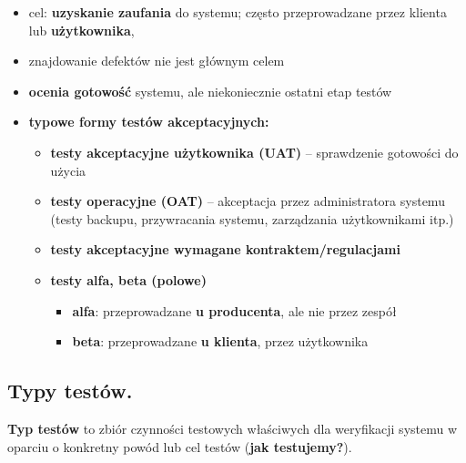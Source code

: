 \documentclass[main.tex]{subfiles}
\begin{document}
    \begin{itemize}[noitemsep]
        \item cel: \textbf{uzyskanie zaufania} do systemu; często przeprowadzane przez klienta lub \textbf{użytkownika},
        \item znajdowanie defektów nie jest głównym celem
        \item \textbf{ocenia gotowość} systemu, ale niekoniecznie ostatni etap testów

        \item \textbf{typowe formy testów akceptacyjnych:}
        \begin{itemize}
            \item \textbf{testy akceptacyjne użytkownika (UAT)} – sprawdzenie gotowości do użycia
            \item \textbf{testy operacyjne (OAT)} – akceptacja przez administratora systemu (testy
            backupu, przywracania systemu, zarządzania użytkownikami itp.)
            \item \textbf{testy akceptacyjne wymagane kontraktem/regulacjami}
            \item \textbf{testy alfa, beta (polowe)}
            \begin{itemize}
                \item \textbf{alfa}: przeprowadzane \textbf{u producenta}, ale nie przez zespół
                \item \textbf{beta}: przeprowadzane \textbf{u klienta}, przez użytkownika
            \end{itemize}
        \end{itemize}
    \end{itemize}

    \subsection{Typy testów.}

    \begin{definition}
        \textbf{Typ testów} to zbiór czynności testowych właściwych dla weryfikacji systemu
        w oparciu o konkretny powód lub cel testów (\textbf{jak testujemy?}).
    \end{definition}
\end{document}
